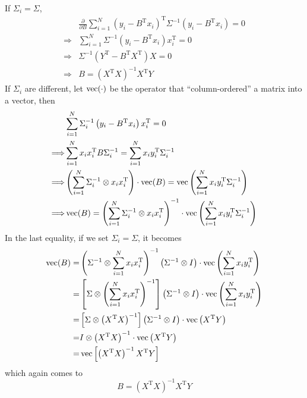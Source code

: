 \begin{sol}
If $\Sigma_i=\Sigma$,
\begin{align*}
& \frac{\partial}{\partial B}\sum_{i=1}^N\left(y_i-B^\mathrm{T}x_i\right)^\mathrm{T}\Sigma^{-1}\left(y_i-B^\mathrm{T}x_i\right)=0\\
\Longrightarrow & \sum_{i=1}^N\Sigma^{-1}\left(y_i-B^\mathrm{T}x_i\right)x_i^\mathrm{T}=0\\
\Longrightarrow & \Sigma^{-1}(Y^\mathrm{T}-B^\mathrm{T}X^\mathrm{T})X=0\\
\Longrightarrow & B=(X^\mathrm{T}X)^{-1}X^\mathrm{T}Y
\end{align*}
If $\Sigma_i$ are different, let $\operatorname{vec}(\cdot)$ be the operator that ``column-ordered'' a matrix into a vector, then
\begin{align*}
& \sum_{i=1}^N\Sigma_i^{-1}\left(y_i-B^\mathrm{T}x_i\right)x_i^\mathrm{T}=0\\
\Longrightarrow & \sum_{i=1}^{N}x_ix_i^\mathrm{T}B\Sigma_i^{-1}=\sum_{i=1}^{N}x_iy_i^\mathrm{T}\Sigma_i^{-1} \\
\Longrightarrow & \left(\sum_{i=1}^{N}\Sigma_i^{-1}\otimes x_ix_i^\mathrm{T}\right)\cdot\operatorname{vec}(B)=\operatorname{vec}\left(\sum_{i=1}^{N}x_iy_i^\mathrm{T}\Sigma_i^{-1}\right)\\
\Longrightarrow & \operatorname{vec}(B)=\left(\sum_{i=1}^{N}\Sigma_i^{-1}\otimes x_ix_i^\mathrm{T}\right)^{-1}\cdot\operatorname{vec}\left(\sum_{i=1}^{N}x_iy_i^\mathrm{T}\Sigma_i^{-1}\right)
\end{align*}
In the last equality, if we set $\Sigma_i=\Sigma$, it becomes
\begin{align*}
\operatorname{vec}(B) =& \left(\Sigma^{-1}\otimes\sum_{i=1}^{N}x_ix_i^\mathrm{T}\right)^{-1} \left(\Sigma^{-1}\otimes I\right)\cdot\operatorname{vec}\left(\sum_{i=1}^{N}x_iy_i^\mathrm{T}\right)\\
=& \left[\Sigma\otimes\left(\sum_{i=1}^{N}x_ix_i^\mathrm{T}\right)^{-1}\right] \left(\Sigma^{-1}\otimes I\right)\cdot\operatorname{vec}\left(\sum_{i=1}^{N}x_iy_i^\mathrm{T}\right)\\
=& \left[\Sigma\otimes\left(X^\mathrm{T}X\right)^{-1}\right] \left(\Sigma^{-1}\otimes I\right)\cdot\operatorname{vec}\left(X^\mathrm{T}Y\right)\\
=& I\otimes \left(X^\mathrm{T}X\right)^{-1}\cdot \operatorname{vec}\left(X^\mathrm{T}Y\right)\\
=& \operatorname{vec}\left[\left(X^\mathrm{T}X\right)^{-1}X^\mathrm{T}Y\right]
\end{align*}
which again comes to
\[
B=\left(X^\mathrm{T}X\right)^{-1}X^\mathrm{T}Y
\]
\end{sol}